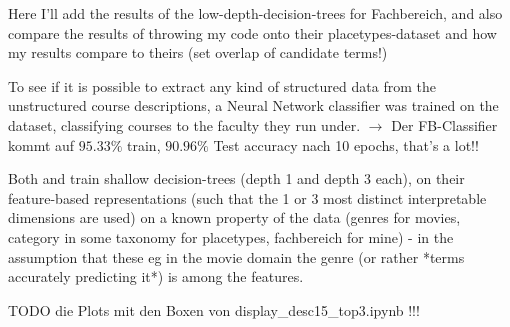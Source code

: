 
Here I'll add the results of the low-depth-decision-trees for Fachbereich, and also compare the results of throwing my code onto their placetypes-dataset and how my results compare to theirs 
(set overlap of candidate terms!)

To see if it is possible to extract any kind of structured data from the unstructured course descriptions, a Neural Network classifier was trained on the dataset, classifying courses to the faculty they run under. 
$\rightarrow$ Der FB-Classifier kommt auf $95.33\%$ train, $90.96\%$ Test accuracy nach 10 epochs, that's a lot!!


Both \cite{Ager2018} and \cite{Alshaikh2020} train shallow decision-trees (depth 1 and depth 3 each), on their feature-based representations (such that the 1 or 3 most distinct interpretable dimensions are used) on a known property of the data (genres for movies, category in some taxonomy for placetypes, fachbereich for mine) - in the assumption that these eg in the movie domain the genre (or rather *terms accurately predicting it*) is among the features.


TODO die Plots mit den Boxen von display_desc15_top3.ipynb !!!